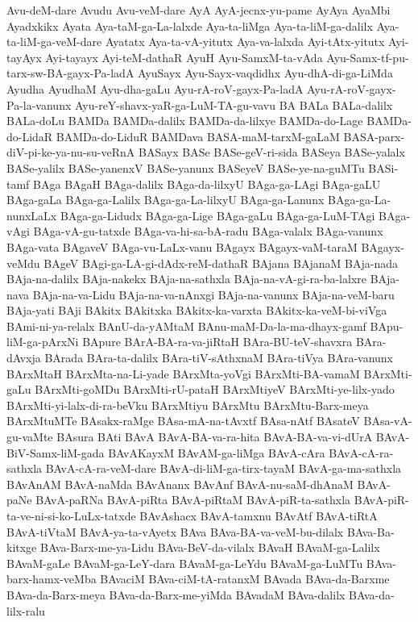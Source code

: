 {Avu-deM-dare
Avudu
Avu-veM-dare
AyA
AyA-jecnx-yu-pame
AyAya
AyaMbi
Ayadxkikx
Ayata
Aya-taM-ga-La-lalxde
Aya-ta-liMga
Aya-ta-liM-ga-dalilx
Aya-ta-liM-ga-veM-dare
Ayatatx
Aya-ta-vA-yitutx
Aya-va-lalxda
Ayi-tAtx-yitutx
Ayi-tayAyx
Ayi-tayayx
Ayi-teM-dathaR
AyuH
Ayu-SamxM-ta-vAda
Ayu-Samx-tf-pu-tarx-sw-BA-gayx-Pa-ladA
AyuSayx
Ayu-Sayx-vaqdidhx
Ayu-dhA-di-ga-LiMda
Ayudha
AyudhaM
Ayu-dha-gaLu
Ayu-rA-roV-gayx-Pa-ladA
Ayu-rA-roV-gayx-Pa-la-vanunx
Ayu-reY-shavx-yaR-ga-LuM-TA-gu-vavu
BA
BALa
BALa-dalilx
BALa-doLu
BAMDa
BAMDa-dalilx
BAMDa-da-lilxye
BAMDa-do-Lage
BAMDa-do-LidaR
BAMDa-do-LiduR
BAMDava
BASA-maM-tarxM-gaLaM
BASA-parx-diV-pi-ke-ya-nu-su-veRnA
BASayx
BASe
BASe-geV-ri-sida
BASeya
BASe-yalalx
BASe-yalilx
BASe-yanenxV
BASe-yanunx
BASeyeV
BASe-ye-na-guMTu
BASi-tamf
BAga
BAgaH
BAga-dalilx
BAga-da-lilxyU
BAga-ga-LAgi
BAga-gaLU
BAga-gaLa
BAga-ga-Lalilx
BAga-ga-La-lilxyU
BAga-ga-Lanunx
BAga-ga-La-nunxLaLx
BAga-ga-Lidudx
BAga-ga-Lige
BAga-gaLu
BAga-ga-LuM-TAgi
BAga-vAgi
BAga-vA-gu-tatxde
BAga-va-hi-sa-bA-radu
BAga-valalx
BAga-vanunx
BAga-vata
BAgaveV
BAga-vu-LaLx-vanu
BAgayx
BAgayx-vaM-taraM
BAgayx-veMdu
BAgeV
BAgi-ga-LA-gi-dAdx-reM-dathaR
BAjana
BAjanaM
BAja-nada
BAja-na-dalilx
BAja-nakekx
BAja-na-sathxla
BAja-na-vA-gi-ra-ba-lalxre
BAja-nava
BAja-na-va-Lidu
BAja-na-va-nAnxgi
BAja-na-vanunx
BAja-na-veM-baru
BAja-yati
BAji
BAkitx
BAkitxka
BAkitx-ka-varxta
BAkitx-ka-veM-bi-viVga
BAmi-ni-ya-relalx
BAnU-da-yAMtaM
BAnu-maM-Da-la-ma-dhayx-gamf
BApu-liM-ga-pArxNi
BApure
BArA-BA-ra-va-jiRtaH
BAra-BU-teV-shavxra
BAra-dAvxja
BArada
BAra-ta-dalilx
BAra-tiV-sAthxnaM
BAra-tiVya
BAra-vanunx
BArxMtaH
BArxMta-na-Li-yade
BArxMta-yoVgi
BArxMti-BA-vamaM
BArxMti-gaLu
BArxMti-goMDu
BArxMti-rU-pataH
BArxMtiyeV
BArxMti-ye-lilx-yado
BArxMti-yi-lalx-di-ra-beVku
BArxMtiyu
BArxMtu
BArxMtu-Barx-meya
BArxMtuMTe
BAsakx-raMge
BAsa-mA-na-tAvxtf
BAsa-nAtf
BAsateV
BAsa-vA-gu-vaMte
BAsura
BAti
BAvA
BAvA-BA-va-ra-hita
BAvA-BA-va-vi-dUrA
BAvA-BiV-Samx-liM-gada
BAvAKayxM
BAvAM-ga-liMga
BAvA-cAra
BAvA-cA-ra-sathxla
BAvA-cA-ra-veM-dare
BAvA-di-liM-ga-tirx-tayaM
BAvA-ga-ma-sathxla
BAvAnAM
BAvA-naMda
BAvAnanx
BAvAnf
BAvA-nu-saM-dhAnaM
BAvA-paNe
BAvA-paRNa
BAvA-piRta
BAvA-piRtaM
BAvA-piR-ta-sathxla
BAvA-piR-ta-ve-ni-si-ko-LuLx-tatxde
BAvAshacx
BAvA-tamxnu
BAvAtf
BAvA-tiRtA
BAvA-tiVtaM
BAvA-ya-ta-vAyetx
BAva
BAva-BA-va-veM-bu-dilalx
BAva-Ba-kitxge
BAva-Barx-me-ya-Lidu
BAva-BeV-da-vilalx
BAvaH
BAvaM-ga-Lalilx
BAvaM-gaLe
BAvaM-ga-LeY-dara
BAvaM-ga-LeYdu
BAvaM-ga-LuMTu
BAva-barx-hamx-veMba
BAvaciM
BAva-ciM-tA-ratanxM
BAvada
BAva-da-Barxme
BAva-da-Barx-meya
BAva-da-Barx-me-yiMda
BAvadaM
BAva-dalilx
BAva-da-lilx-ralu
}
